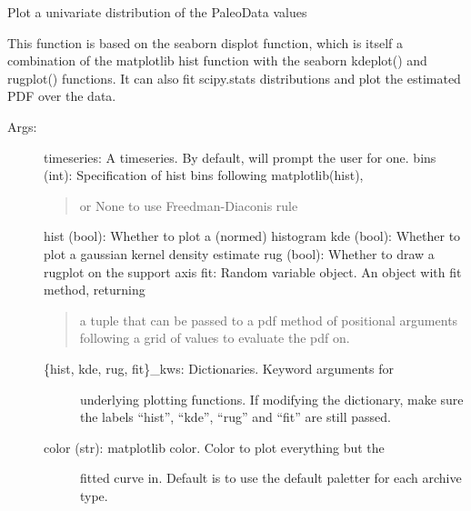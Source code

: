 \documentclass[letterpaper,10pt,english]{sphinxmanual}
\begin{document}

\begin{fulllineitems}
\label{\detokenize{Main:pyleoclim.histTs}}
Plot a univariate distribution of the PaleoData values

This function is based on the seaborn displot function, which is
itself a combination of the matplotlib hist function with the
seaborn kdeplot() and rugplot() functions. It can also fit
scipy.stats distributions and plot the estimated PDF over the data.
\begin{description}
\item[{Args:}] \leavevmode
timeseries: A timeseries. By default, will prompt the user for one.
bins (int): Specification of hist bins following matplotlib(hist),
\begin{quote}

or None to use Freedman-Diaconis rule
\end{quote}

hist (bool): Whether to plot a (normed) histogram
kde (bool): Whether to plot a gaussian kernel density estimate
rug (bool): Whether to draw a rugplot on the support axis
fit: Random variable object. An object with fit method, returning
\begin{quote}

a tuple that can be passed to a pdf method of positional
arguments following a grid of values to evaluate the pdf on.
\end{quote}
\begin{description}
\item[{\{hist, kde, rug, fit\}\_kws: Dictionaries. Keyword arguments for}] \leavevmode
underlying plotting functions. If modifying the dictionary, make
sure the labels “hist”, “kde”, “rug” and “fit” are still passed.

\item[{color (str): matplotlib color. Color to plot everything but the}] \leavevmode
fitted curve in. Default is to use the default paletter for each
archive type.


\end{description}
\end{description}
\end{fulllineitems}
\end{document}
